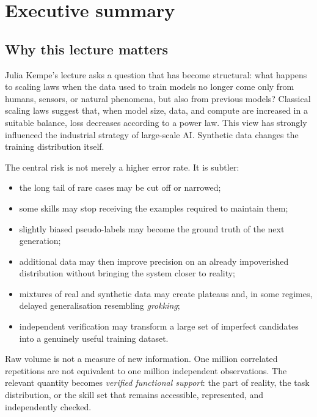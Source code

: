 \section{Executive summary}

\subsection{Why this lecture matters}

Julia Kempe's lecture asks a question that has become structural: what happens to scaling laws when the data used to train models no longer come only from humans, sensors, or natural phenomena, but also from previous models? Classical scaling laws suggest that, when model size, data, and compute are increased in a suitable balance, loss decreases according to a power law. This view has strongly influenced the industrial strategy of large-scale AI. Synthetic data changes the training distribution itself.

The central risk is not merely a higher error rate. It is subtler:

\begin{itemize}[leftmargin=*]
  \item the long tail of rare cases may be cut off or narrowed;
  \item some skills may stop receiving the examples required to maintain them;
  \item slightly biased pseudo-labels may become the ground truth of the next generation;
  \item additional data may then improve precision on an already impoverished distribution without bringing the system closer to reality;
  \item mixtures of real and synthetic data may create plateaus and, in some regimes, delayed generalisation resembling \emph{grokking};
  \item independent verification may transform a large set of imperfect candidates into a genuinely useful training dataset.
\end{itemize}

\begin{keyidea}
Raw volume is not a measure of new information. One million correlated repetitions are not equivalent to one million independent observations. The relevant quantity becomes \emph{verified functional support}: the part of reality, the task distribution, or the skill set that remains accessible, represented, and independently checked.
\end{keyidea}

